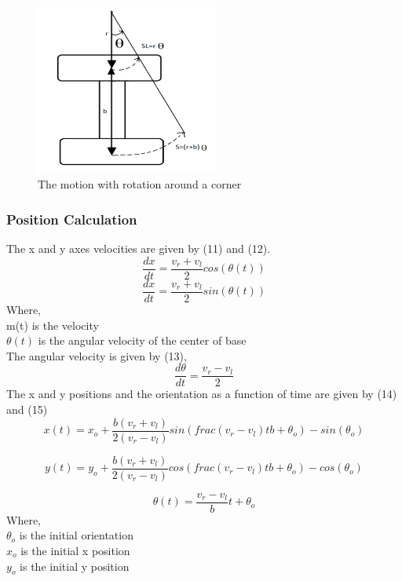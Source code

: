\documentclass[conference]{IEEEtran}
\begin{document}
\begin{figure}[h]
\includegraphics[width=6cm]{motionwithrotation.png}
\centering
\caption{The motion with rotation around a corner}\label{net_img}
\end{figure}

\subsubsection{Position Calculation}
The x and y axes velocities are given by (11) and (12).
\begin{equation} \label{eq:11}
\frac{dx}{dt}=\frac{v_r+v_l}{2}cos(\theta(t))
\end{equation}
\begin{equation} \label{eq:12}
\frac{dx}{dt}=\frac{v_r+v_l}{2}sin(\theta(t))
\end{equation}
Where,\\
m(t) is the velocity \\
$\theta(t)$ is the angular velocity of the center of base\\
The angular velocity is given by (13),\\
\begin{equation} \label{eq:13}
\frac{d\theta}{dt}=\frac{v_r-v_l}{2}
\end{equation}
The x and y positions and the orientation as a function of time are given by (14) and (15)\\
\begin{equation} \label{eq:14}
x(t)=x_o+\frac{b(v_r+v_l)}{2(v_r-v_l)}sin(frac{(v_r-v_l)t}{b}+\theta_o)-sin(\theta_o)
\end{equation}

\begin{equation} \label{eq:15}
y(t)=y_o+\frac{b(v_r+v_l)}{2(v_r-v_l)}cos(frac{(v_r-v_l)t}{b}+\theta_o)-cos(\theta_o)
\end{equation}

\begin{equation} \label{eq:16}
\theta(t)=\frac{v_r-v_l}{b}t+\theta_o
\end{equation}
Where,\\
$\theta_o$ is the initial orientation\\
$x_o$ is the initial x position\\
$y_o$ is the initial y position\\
\end{document}
